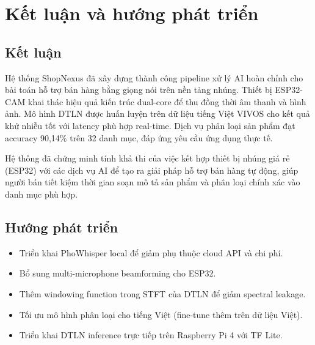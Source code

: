 \chapter{Kết luận và hướng phát triển}

\section{Kết luận}

Hệ thống ShopNexus đã xây dựng thành công pipeline xử lý AI hoàn chỉnh
cho bài toán hỗ trợ bán hàng bằng giọng nói trên nền tảng nhúng.
Thiết bị ESP32-CAM khai thác hiệu quả kiến trúc dual-core để thu đồng thời
âm thanh và hình ảnh. Mô hình DTLN được huấn luyện trên dữ liệu tiếng Việt
VIVOS cho kết quả khử nhiễu tốt với latency phù hợp real-time.
Dịch vụ phân loại sản phẩm đạt accuracy 90,14\% trên 32 danh mục,
đáp ứng yêu cầu ứng dụng thực tế.

Hệ thống đã chứng minh tính khả thi của việc kết hợp thiết bị nhúng giá rẻ
(ESP32) với các dịch vụ AI để tạo ra giải pháp hỗ trợ bán hàng tự động,
giúp người bán tiết kiệm thời gian soạn mô tả sản phẩm và phân loại
chính xác vào danh mục phù hợp.

\section{Hướng phát triển}

\begin{itemize}
\item Triển khai PhoWhisper local để giảm phụ thuộc cloud API và chi phí.
\item Bổ sung multi-microphone beamforming cho ESP32.
\item Thêm windowing function trong STFT của DTLN để giảm spectral leakage.
\item Tối ưu mô hình phân loại cho tiếng Việt (fine-tune thêm trên dữ liệu Việt).
\item Triển khai DTLN inference trực tiếp trên Raspberry Pi 4 với TF Lite.
\end{itemize}
